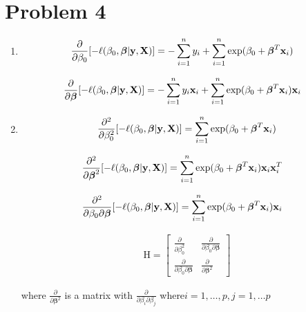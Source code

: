 \documentclass{article}
\newcommand{\vect}[1]{\boldsymbol{#1}}
\newcommand{\vectrm}[1]{\boldsymbol{\rm #1}}
\begin{document}
\section*{Problem 4}
\begin{enumerate}[label=(\alph*)]
\item 
\begin{align*}
\frac{\partial}{\partial \beta_0}[ -\ell(\beta_0, \vect{\beta}| \vectrm{y}, \vectrm{X}) ]&= -\sum_{i=1}^{n} y_i + \sum_{i=1}^{n}\exp(\beta_0 + \vect{\beta}^T \vectrm{x}_i) 
\end{align*}

\begin{align*}
\frac{\partial}{\partial \vect{\beta}}[ -\ell(\beta_0, \vect{\beta}| \vectrm{y}, \vectrm{X}) ]&= -\sum_{i=1}^{n} y_i \vectrm{x}_i + \sum_{i=1}^{n}\exp(\beta_0 + \vect{\beta}^T \vectrm{x}_i) \vectrm{x}_i
\end{align*}

\item
\begin{align*}
\frac{\partial^2}{\partial \beta_0^2}[ -\ell(\beta_0, \vect{\beta}| \vectrm{y}, \vectrm{X}) ]&= \sum_{i=1}^{n}\exp(\beta_0 + \vect{\beta}^T \vectrm{x}_i) \\
\end{align*}

\begin{align*}
\frac{\partial^2}{\partial \vect{\beta}^2}[ -\ell(\beta_0, \vect{\beta}| \vectrm{y}, \vectrm{X}) ]&= \sum_{i=1}^{n}\exp(\beta_0 + \vect{\beta}^T \vectrm{x}_i) \vectrm{x}_i \vectrm{x}_i^T
\end{align*}

\begin{align*}
\frac{\partial^2}{\partial \beta_0 \partial \vect{\beta}}[ -\ell(\beta_0, \vect{\beta}| \vectrm{y}, \vectrm{X}) ]&= \sum_{i=1}^{n}\exp(\beta_0 + \vect{\beta}^T \vectrm{x}_i) \vectrm{x}_i
\end{align*}

\begin{align*}
\mathrm{H} = \begin{bmatrix}
    \frac{\partial}{\partial \beta_0^2} & \frac{\partial}{\partial \beta_0 \partial \vect{\beta}} \\
    \frac{\partial}{\partial \beta_0 \partial \vect{\beta}} & \frac{\partial}{\partial \vect{\beta}^2}
\end{bmatrix}
\end{align*}

where \(\frac{\partial}{\partial \vect{\beta}^2}\) is a matrix with \(\frac{\partial}{\partial \beta_i \partial \beta_j}\) where\(i = 1,\ldots, p, j = 1,\ldots p\)


\end{enumerate}
\end{document}
